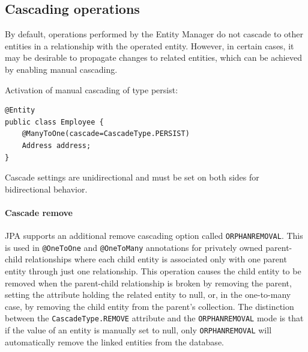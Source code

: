 \subsection{Cascading operations}
By default, operations performed by the Entity Manager do not cascade to other entities in a relationship with the operated entity. 
However, in certain cases, it may be desirable to propagate changes to related entities, which can be achieved by enabling manual cascading.
\begin{example}
    Activation of manual cascading of type persist:
\begin{lstlisting}[style=Java]
@Entity
public class Employee {
    @ManyToOne(cascade=CascadeType.PERSIST)
    Address address;
}
\end{lstlisting}
\end{example}
Cascade settings are unidirectional and must be set on both sides for bidirectional behavior.

\paragraph*{Cascade remove}
JPA supports an additional remove cascading option called \texttt{ORPHANREMOVAL}. 
This is used in \texttt{@OneToOne} and \texttt{@OneToMany} annotations for privately owned parent-child relationships where each child entity is associated only with one parent entity through just one relationship. 
This operation causes the child entity to be removed when the parent-child relationship is broken by removing the parent, setting the attribute holding the related entity to null, or, in the one-to-many case, by removing the child entity from the parent's collection.
The distinction between the \texttt{CascadeType.REMOVE} attribute and the \texttt{ORPHANREMOVAL} mode is that if the value of an entity is manually set to null, only \texttt{ORPHANREMOVAL} will automatically remove the linked entities from the database.